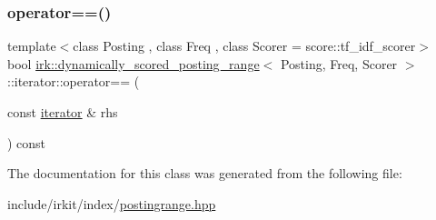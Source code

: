 \subsubsection{\texorpdfstring{operator==()}{operator==()}}
{\footnotesize\ttfamily template$<$class Posting , class Freq , class Scorer  = score\+::tf\+\_\+idf\+\_\+scorer$>$ \\
bool \mbox{\hyperlink{classirk_1_1dynamically__scored__posting__range}{irk\+::dynamically\+\_\+scored\+\_\+posting\+\_\+range}}$<$ Posting, Freq, Scorer $>$\+::iterator\+::operator== (\begin{DoxyParamCaption}\item[{const \mbox{\hyperlink{classirk_1_1dynamically__scored__posting__range_1_1iterator}{iterator}} \&}]{rhs }\end{DoxyParamCaption}) const\hspace{0.3cm}{\ttfamily [inline]}}



The documentation for this class was generated from the following file\+:\begin{DoxyCompactItemize}
\item 
include/irkit/index/\mbox{\hyperlink{postingrange_8hpp}{postingrange.\+hpp}}\end{DoxyCompactItemize}
